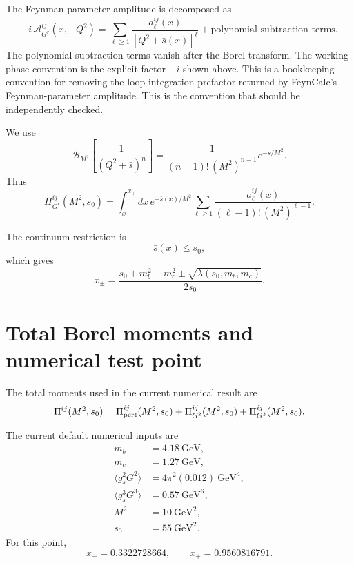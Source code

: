 \documentclass[11pt]{article}
\begin{document}
The Feynman-parameter amplitude is decomposed as
\begin{equation}
  -i\,\mathcal{A}_{G^r}^{ij}(x,-Q^2)
  =
  \sum_{\ell\geq 1}
  \frac{a_\ell^{ij}(x)}
  {\left[Q^2+\bar s(x)\right]^\ell}
  +
  \text{polynomial subtraction terms}.
\end{equation}
The polynomial subtraction terms vanish after the Borel transform.  The
working phase convention is the explicit factor $-i$ shown above.  This is a
bookkeeping convention for removing the loop-integration prefactor returned
by FeynCalc's Feynman-parameter amplitude.  This is the convention that
should be independently checked.

We use
\begin{equation}
  \mathcal{B}_{M^2}
  \left[
    \frac{1}{(Q^2+\bar s)^n}
  \right]
  =
  \frac{1}{(n-1)!\,(M^2)^{n-1}}
  e^{-\bar s/M^2}.
\end{equation}
Thus
\begin{equation}
  \Pi_{G^r}^{ij}(M^2,s_0)
  =
  \int_{x_-}^{x_+}
  dx\,
  e^{-\bar s(x)/M^2}
  \sum_{\ell\geq1}
  \frac{a_\ell^{ij}(x)}
  {(\ell-1)!\,(M^2)^{\ell-1}}.
\end{equation}

The continuum restriction is
\begin{equation}
  \bar s(x)\leq s_0,
\end{equation}
which gives
\begin{equation}
  x_\pm
  =
  \frac{
    s_0+m_b^2-m_c^2
    \pm
    \sqrt{\lambda(s_0,m_b,m_c)}
  }
  {2s_0}.
\end{equation}

\section{Total Borel moments and numerical test point}

The total moments used in the current numerical result are
\begin{equation}
  \Pi^{ij}(M^2,s_0)
  =
  \Pi_{\rm pert}^{ij}(M^2,s_0)
  +
  \Pi_{G^2}^{ij}(M^2,s_0)
  +
  \Pi_{G^3}^{ij}(M^2,s_0).
\end{equation}

The current default numerical inputs are
\begin{align}
  m_b &= 4.18~\text{GeV},\\
  m_c &= 1.27~\text{GeV},\\
  \langle g_s^2G^2\rangle &= 4\pi^2(0.012)~\text{GeV}^4,\\
  \langle g_s^3G^3\rangle &= 0.57~\text{GeV}^6,\\
  M^2 &= 10~\text{GeV}^2,\\
  s_0 &= 55~\text{GeV}^2.
\end{align}
For this point,
\begin{equation}
  x_- = 0.3322728664,\qquad
  x_+ = 0.9560816791.
\end{equation}
\end{document}

